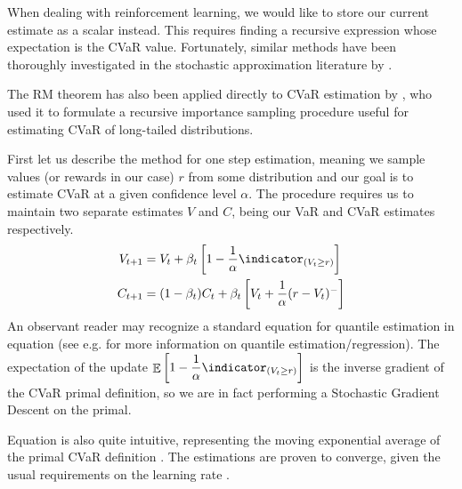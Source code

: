 When dealing with reinforcement learning, we would like to store our current estimate as a scalar instead. This requires finding a recursive expression whose expectation is the CVaR value. Fortunately, similar methods have been thoroughly investigated in the stochastic approximation literature by \citet{robbins1951stochastic}.

The RM theorem has also been applied directly to CVaR estimation by \citet{bardou2009recursive}, who used it to formulate a recursive importance sampling procedure useful for estimating CVaR of long-tailed distributions.

First let us describe the method for one step estimation, meaning we sample values (or rewards in our case) $r$ from some distribution and our goal is to estimate CVaR at a given confidence level $\alpha$. The procedure requires us to maintain two separate estimates $V$ and $C$, being our VaR and CVaR estimates respectively.
\begin{align}
V_{t+1} &= V_{t} + \beta_t \bsquare{1-\dfrac{1}{\alpha}\indicator_{(V_t \ge r)}}\label{eqn:varestimate}\\
C_{t+1} &= (1-\beta_t)C_t + \beta_t \bsquare{V_t + \dfrac{1}{\alpha}(r-V_t)^-}\label{eqn:cvarestimate}
\end{align}
An observant reader may recognize a standard equation for quantile estimation in equation  (see e.g. \citet{koenker2001quantile} for more information on quantile estimation/regression). The expectation of the update $\expect\bsquare{1-\dfrac{1}{\alpha}\indicator_{(V_t \ge r)}}$ is the inverse gradient of the CVaR primal definition, so we are in fact performing a Stochastic Gradient Descent on the primal.

Equation  is also quite intuitive, representing the moving exponential average of the primal CVaR definition . The estimations are proven to converge, given the usual requirements on the learning rate  \citep{bardou2009recursive}.


